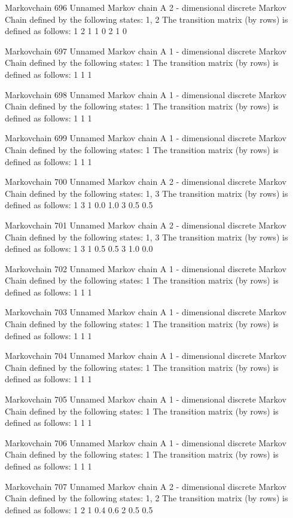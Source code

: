 \documentclass[
  nojss]{jss}
\begin{document}
\begin{CodeChunk}
\begin{CodeOutput}
Markovchain  696 
Unnamed Markov chain 
 A  2 - dimensional discrete Markov Chain defined by the following states: 
 1, 2 
 The transition matrix  (by rows)  is defined as follows: 
  1 2
1 1 0
2 1 0

Markovchain  697 
Unnamed Markov chain 
 A  1 - dimensional discrete Markov Chain defined by the following states: 
 1 
 The transition matrix  (by rows)  is defined as follows: 
  1
1 1

Markovchain  698 
Unnamed Markov chain 
 A  1 - dimensional discrete Markov Chain defined by the following states: 
 1 
 The transition matrix  (by rows)  is defined as follows: 
  1
1 1

Markovchain  699 
Unnamed Markov chain 
 A  1 - dimensional discrete Markov Chain defined by the following states: 
 1 
 The transition matrix  (by rows)  is defined as follows: 
  1
1 1

Markovchain  700 
Unnamed Markov chain 
 A  2 - dimensional discrete Markov Chain defined by the following states: 
 1, 3 
 The transition matrix  (by rows)  is defined as follows: 
    1   3
1 0.0 1.0
3 0.5 0.5

Markovchain  701 
Unnamed Markov chain 
 A  2 - dimensional discrete Markov Chain defined by the following states: 
 1, 3 
 The transition matrix  (by rows)  is defined as follows: 
    1   3
1 0.5 0.5
3 1.0 0.0

Markovchain  702 
Unnamed Markov chain 
 A  1 - dimensional discrete Markov Chain defined by the following states: 
 1 
 The transition matrix  (by rows)  is defined as follows: 
  1
1 1

Markovchain  703 
Unnamed Markov chain 
 A  1 - dimensional discrete Markov Chain defined by the following states: 
 1 
 The transition matrix  (by rows)  is defined as follows: 
  1
1 1

Markovchain  704 
Unnamed Markov chain 
 A  1 - dimensional discrete Markov Chain defined by the following states: 
 1 
 The transition matrix  (by rows)  is defined as follows: 
  1
1 1

Markovchain  705 
Unnamed Markov chain 
 A  1 - dimensional discrete Markov Chain defined by the following states: 
 1 
 The transition matrix  (by rows)  is defined as follows: 
  1
1 1

Markovchain  706 
Unnamed Markov chain 
 A  1 - dimensional discrete Markov Chain defined by the following states: 
 1 
 The transition matrix  (by rows)  is defined as follows: 
  1
1 1

Markovchain  707 
Unnamed Markov chain 
 A  2 - dimensional discrete Markov Chain defined by the following states: 
 1, 2 
 The transition matrix  (by rows)  is defined as follows: 
    1   2
1 0.4 0.6
2 0.5 0.5


\end{CodeOutput}
\end{CodeChunk}
\end{document}

